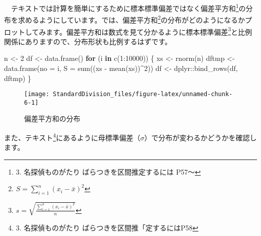 \documentclass[]{tufte-handout}
\newenvironment{Shaded}{}{}
\newcommand{\AttributeTok}[1]{\textcolor[rgb]{0.49,0.56,0.16}{#1}}
\newcommand{\ControlFlowTok}[1]{\textcolor[rgb]{0.00,0.44,0.13}{\textbf{#1}}}
\newcommand{\DecValTok}[1]{\textcolor[rgb]{0.25,0.63,0.44}{#1}}
\newcommand{\FunctionTok}[1]{\textcolor[rgb]{0.02,0.16,0.49}{#1}}
\newcommand{\NormalTok}[1]{#1}
\newcommand{\OtherTok}[1]{\textcolor[rgb]{0.00,0.44,0.13}{#1}}
\newcommand{\SpecialCharTok}[1]{\textcolor[rgb]{0.25,0.44,0.63}{#1}}
\begin{document}
　テキスト\citep{ToukeiKaisekinoHanashi}では計算を簡単にするために標本標準偏差ではなく偏差平方和\footnote{3.
  名探偵ものがたり ばらつきを区間推定するには P57〜}の分布を求めるようにしています。では、偏差平方和\footnote{\(S = \sum_{i = 1}^{n}{(x_i - \bar{x})^2}\)}の分布がどのようになるかプロットしてみます。偏差平方和は数式を見て分かるように標本標準偏差\footnote{\(s = \sqrt{\frac{\sum_{i = 1}^{n}{(x_i - \bar{x})^2}}{n}}\)}と比例関係にありますので、分布形状も比例するはずです。

\begin{Shaded}
\begin{Highlighting}[numbers=left,,]
\NormalTok{n }\OtherTok{\textless{}{-}} \DecValTok{2}
\NormalTok{df }\OtherTok{\textless{}{-}} \FunctionTok{data.frame}\NormalTok{()}
\ControlFlowTok{for}\NormalTok{ (i }\ControlFlowTok{in} \FunctionTok{c}\NormalTok{(}\DecValTok{1}\SpecialCharTok{:}\DecValTok{10000}\NormalTok{)) \{}
\NormalTok{  xs }\OtherTok{\textless{}{-}} \FunctionTok{rnorm}\NormalTok{(n)}
\NormalTok{  dftmp }\OtherTok{\textless{}{-}} \FunctionTok{data.frame}\NormalTok{(}\AttributeTok{no =}\NormalTok{ i, }\AttributeTok{S =} \FunctionTok{sum}\NormalTok{((xs }\SpecialCharTok{{-}} \FunctionTok{mean}\NormalTok{(xs))}\SpecialCharTok{\^{}}\DecValTok{2}\NormalTok{))}
\NormalTok{  df }\OtherTok{\textless{}{-}}\NormalTok{ dplyr}\SpecialCharTok{::}\FunctionTok{bind\_rows}\NormalTok{(df, dftmp)}
\NormalTok{\}}
\end{Highlighting}
\end{Shaded}

\begin{figure}

{\centering \texttt{[image: StandardDivision\_files/figure-latex/unnamed-chunk-6-1]} 

}

\caption[偏差平方和の分布]{偏差平方和の分布}\label{fig:unnamed-chunk-6}
\end{figure}

また、テキスト\footnote{3. 名探偵ものがたり
  ばらつきを区間推「定するにはP58}にあるように母標準偏差（\(\sigma\)）で分布が変わるかどうかを確認します。

\begin{figure*}

{\centering {}

}

\end{figure*}
\end{document}
